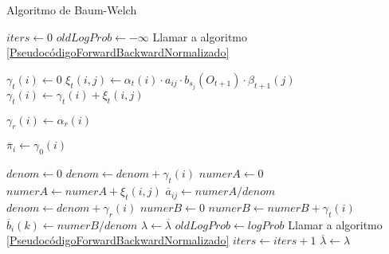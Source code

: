\medskip

\begin{breakablealgorithm}
\caption{Algoritmo de Baum-Welch} \label{PseudocódigoBaum-Welch}
\begin{algorithmic}[1]


\State $iters \gets 0$
\State $oldLogProb \gets -\infty$
\State Llamar a algoritmo \ref{PseudocódigoForwardBackwardNormalizado} \State


    
    \State
            \State $\gamma_t(i)\gets0$
                \State $\xi_t(i,j)\gets \alpha_t(i)\cdot a_{ij}\cdot b_{s_j}(O_{t+1})\cdot \beta_{t+1}(j)$
                \State $\gamma_t(i)\gets \gamma_t(i)+\xi_t(i,j)$
            \EndFor
        \EndFor
    \EndFor \State
    
    
        \State $\gamma_r(i)\gets \alpha_r(i)$
    \EndFor \State
    
        \State $\overline{\pi}_i\gets\gamma_0(i)$
    \EndFor \State
    
        \State $denom\gets0$
            \State $denom\gets denom+\gamma_t(i)$
        \EndFor \State
            \State $numerA\gets0$
                \State $numerA\gets numerA+\xi_t(i,j)$
            \EndFor
            \State $\overline{a}_{ij}\gets numerA/denom$
        \EndFor \State
        \State $denom\gets denom+\gamma_r(i)$
            \State $numerB\gets0$
                    \State $numerB \gets numerB+\gamma_t(i)$
                \EndIf
            \EndFor 
            \State $\overline{b}_i(k)\gets numerB/denom$
        \EndFor
    \EndFor \State
    \State $\lambda\gets\overline{\lambda}$
    \State $oldLogProb\gets logProb$
    \State Llamar a algoritmo \ref{PseudocódigoForwardBackwardNormalizado}
    \State $iters\gets iters+1$
\EndWhile \State
\State \Return $\overline{\lambda}\gets\lambda$
\end{algorithmic}
\end{breakablealgorithm}

